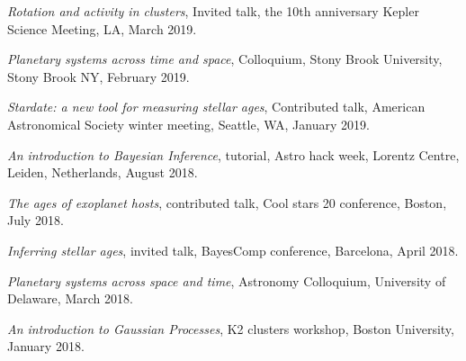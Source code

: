 \documentclass[12pt,letterpaper]{article}
\begin{document}
\begin{list}{}{\cvlist}
\item
    {\it Rotation and activity in clusters}, Invited talk, the 10th
    anniversary Kepler Science Meeting, LA, March 2019.
\item
    {\it Planetary systems across time and space}, Colloquium, Stony Brook
    University, Stony Brook NY, February 2019.
\item
    {\it Stardate: a new tool for measuring stellar ages}, Contributed talk,
    American Astronomical Society winter meeting, Seattle, WA, January 2019.
\item
    {\it An introduction to Bayesian Inference}, tutorial, Astro hack
    week, Lorentz Centre, Leiden, Netherlands, August 2018.
\item
    {\it The ages of exoplanet hosts}, contributed talk, Cool stars 20
    conference, Boston, July 2018.
\item
    {\it Inferring stellar ages}, invited talk, BayesComp conference,
    Barcelona, April 2018.
\item
    {\it Planetary systems across space and time}, Astronomy Colloquium,
    University of Delaware, March 2018.
\item{\it An introduction to Gaussian Processes}, K2 clusters workshop,
    Boston University, January 2018.
\end{list}
\end{document}

